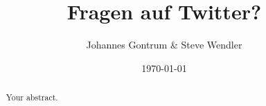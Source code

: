 \documentclass[
	11pt,
	notitlepage,
	oneside
]{scrartcl}
\title{Fragen auf Twitter?}
\author{Johannes Gontrum \& Steve Wendler}
\date{\today}
\begin{document}
\maketitle

\begin{abstract}
Your abstract.
\end{abstract}








\newpage
\tableofcontents
\newpage








\end{document}
